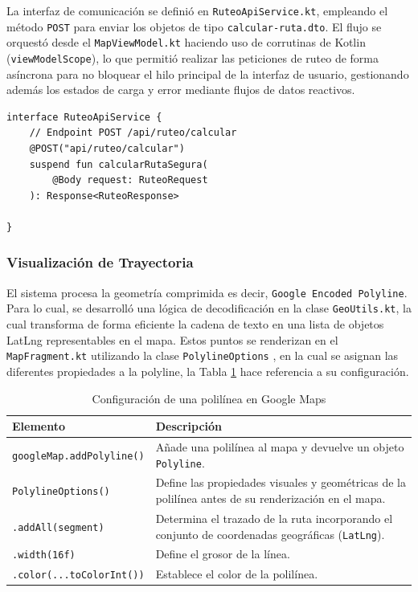 La interfaz de comunicación se definió en \texttt{RuteoApiService.kt}, empleando el método \texttt{POST} para enviar los objetos de tipo \texttt{calcular-ruta.dto}. El flujo se orquestó desde el \texttt{MapViewModel.kt} haciendo uso de corrutinas de Kotlin (\texttt{viewModelScope}), lo que permitió realizar las peticiones de ruteo de forma asíncrona para no bloquear el hilo principal de la interfaz de usuario, gestionando además los estados de carga y error mediante flujos de datos reactivos.

\begin{lstlisting}
interface RuteoApiService {
    // Endpoint POST /api/ruteo/calcular
    @POST("api/ruteo/calcular")
    suspend fun calcularRutaSegura(
        @Body request: RuteoRequest
    ): Response<RuteoResponse>

}
\end{lstlisting}

\subsubsection{Visualización de Trayectoria}
El sistema procesa la geometría comprimida es decir, \texttt{Google Encoded Polyline}. Para lo cual, se desarrolló una lógica de decodificación en la clase \texttt{GeoUtils.kt}, la cual transforma de forma eficiente la cadena de texto en una lista de objetos LatLng representables en el mapa. Estos puntos se renderizan en el \texttt{MapFragment.kt} utilizando la clase \texttt{PolylineOptions} \cite{googlemaps2024}, en la cual se asignan las diferentes propiedades a la polyline, la Tabla \ref{tab:polyline} hace referencia a su configuración.
\begin{table}[H]
\caption{Configuración de una polilínea en Google Maps}
\label{tab:polyline}
\centering
\begin{tabular}{|p{4.5cm}|p{10.5cm}|}
\hline
\textbf{Elemento} & \textbf{Descripción} \\
\hline
\texttt{googleMap.addPolyline()} & Añade una polilínea al mapa y devuelve un objeto \texttt{Polyline}.\\
\hline
\texttt{PolylineOptions()} & Define las propiedades visuales y geométricas de la polilínea antes de su renderización en el mapa. \\
\hline
\texttt{.addAll(segment)} & Determina el trazado de la ruta incorporando el  conjunto de coordenadas geográficas (\texttt{LatLng}). \\
\hline
\texttt{.width(16f)} & Define el grosor de la línea. \\
\hline
\texttt{.color(...toColorInt())} & Establece el color de la polilínea. \\
\hline
\end{tabular}
\end{table}

